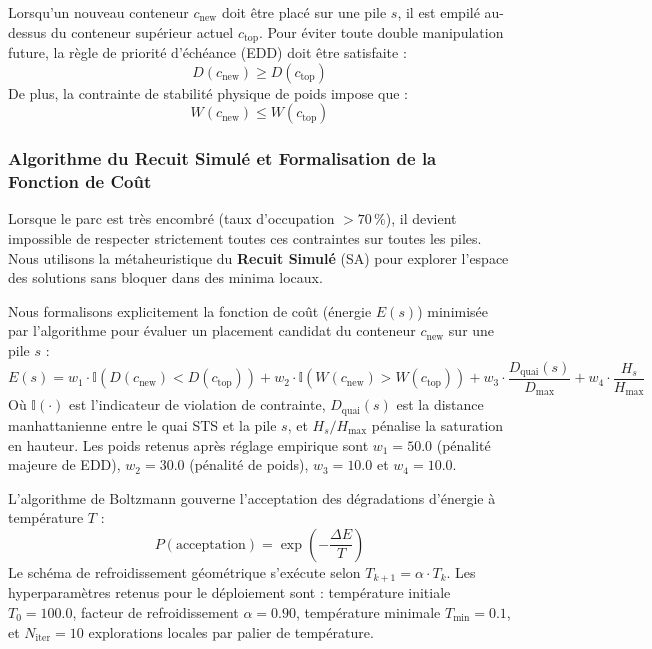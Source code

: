 \documentclass[12pt,a4paper]{article}
\begin{document}
Lorsqu'un nouveau conteneur $c_{\text{new}}$ doit être placé sur une pile $s$, il est empilé au-dessus du conteneur supérieur actuel $c_{\text{top}}$.
Pour éviter toute double manipulation future, la règle de priorité d'échéance (\ac{EDD}) doit être satisfaite \cite{Baker2009} :
\begin{equation}
  D(c_{\text{new}}) \geq D(c_{\text{top}})
\end{equation}
De plus, la contrainte de stabilité physique de poids impose que :
\begin{equation}
  W(c_{\text{new}}) \le W(c_{\text{top}})
\end{equation}

\subsubsection{Algorithme du Recuit Simulé et Formalisation de la Fonction de Coût}
Lorsque le parc est très encombré (taux d'occupation $> 70\,\%$), il devient impossible de respecter strictement toutes ces contraintes sur toutes les piles. Nous utilisons la métaheuristique du \textbf{Recuit Simulé} (\ac{SA}) \cite{Kirkpatrick1983} pour explorer l'espace des solutions sans bloquer dans des minima locaux.

Nous formalisons explicitement la fonction de coût (énergie $E(s)$) minimisée par l'algorithme pour évaluer un placement candidat du conteneur $c_{\text{new}}$ sur une pile $s$ :
\begin{equation}
  E(s) = w_1 \cdot \mathbb{I}\left(D(c_{\text{new}}) < D(c_{\text{top}})\right) + w_2 \cdot \mathbb{I}\left(W(c_{\text{new}}) > W(c_{\text{top}})\right) + w_3 \cdot \frac{D_{\text{quai}}(s)}{D_{\max}} + w_4 \cdot \frac{H_s}{H_{\max}}
\end{equation}
Où $\mathbb{I}(\cdot)$ est l'indicateur de violation de contrainte, $D_{\text{quai}}(s)$ est la distance manhattanienne entre le quai STS et la pile $s$, et $H_s/H_{\max}$ pénalise la saturation en hauteur. Les poids retenus après réglage empirique sont $w_1 = 50.0$ (pénalité majeure de EDD), $w_2 = 30.0$ (pénalité de poids), $w_3 = 10.0$ et $w_4 = 10.0$.

L'algorithme de Boltzmann gouverne l'acceptation des dégradations d'énergie à température $T$ :
\begin{equation}
  P(\text{acceptation}) = \exp\left(-\frac{\Delta E}{T}\right)
\end{equation}
Le schéma de refroidissement géométrique s'exécute selon $T_{k+1} = \alpha \cdot T_k$. Les hyperparamètres retenus pour le déploiement sont : température initiale $T_0 = 100.0$, facteur de refroidissement $\alpha = 0.90$, température minimale $T_{\min} = 0.1$, et $N_{\text{iter}} = 10$ explorations locales par palier de température.
\end{document}
